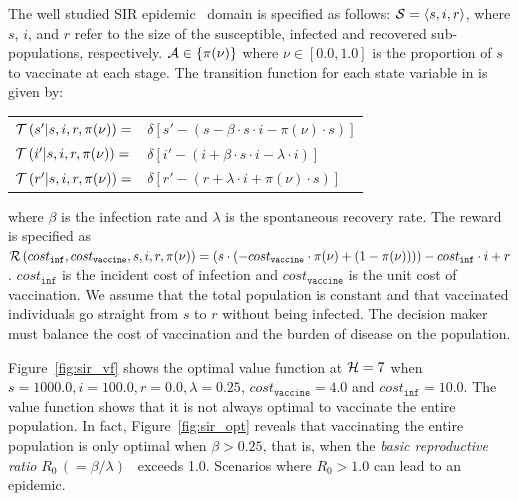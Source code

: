 \documentclass[letterpaper]{article}
\begin{document}
The well studied SIR epidemic~\cite{KermackMcKendrick_1927} domain is specified as follows: {\footnotesize $ \mathcal{S} = \left\langle s, i, r \right\rangle$}, where $ s $, $ i $, and $ r $ refer to the size of the susceptible, infected and recovered sub-populations, respectively. {\footnotesize $ \mathcal{A} \in \left\lbrace \pi(\nu) \right\rbrace $} where {\footnotesize $\nu \in \left[0.0, 1.0\right]$} is the proportion of $ s $ to vaccinate at each stage. The transition function {\footnotesize \Transition} for each state variable in {\footnotesize \State} is given by:

{\footnotesize 
    \begin{tabular}{ll}
        $ \mathcal{T}\left( s' | s, i, r, \pi(\nu) \right) =$ & $ \delta \left[ s' - (s - \beta \cdot s \cdot i - \pi(\nu) \cdot s) \right] $ \\
        $ \mathcal{T}\left( i' | s, i, r, \pi(\nu) \right) =$ & $ \delta \left[ i' - (i + \beta \cdot s \cdot i - \lambda \cdot i) \right] $ \\
        $ \mathcal{T}\left( r' | s, i, r, \pi(\nu) \right) =$ & $ \delta \left[ r' - (r + \lambda \cdot i + \pi(\nu) \cdot s) \right] $ \\            
    \end{tabular}
}%
where {\footnotesize $ \beta $} is the infection rate and {\footnotesize $\lambda$} is the spontaneous recovery rate. The reward is specified as {\footnotesize $ \mathcal{R}\left(cost_{\mathtt{inf}}, cost_{\mathtt{vaccine}}, s, i, r, \pi(\nu) \right) = (s \cdot (-cost_{\mathtt{vaccine}} \cdot \pi(\nu) + (1 - \pi(\nu)))) - cost_{\mathtt{inf}} \cdot i + r$}. {\footnotesize $ cost_{\mathtt{inf}} $} is the incident cost of infection and {\footnotesize $ cost_{\mathtt{vaccine}} $} is the unit cost of vaccination. We assume that the total population is constant and that vaccinated individuals go straight from {\footnotesize $ s $} to {\footnotesize $ r $} without being infected. The decision maker must balance the cost of vaccination and the burden of disease on the population. 

Figure~\ref{fig:sir_vf} shows the optimal value function at {\footnotesize$ \mathcal{H} = 7 $} when {\footnotesize $ s = 1000.0, i = 100.0, r = 0.0, \lambda = 0.25 $}, {\footnotesize $ cost_{\mathtt{vaccine}} = 4.0$} and {\footnotesize $ cost_{\mathtt{inf}} = 10.0 $}. The value function shows that it is not always optimal to vaccinate the entire population. In fact, Figure~\ref{fig:sir_opt} reveals that vaccinating the entire population is only optimal when {\footnotesize $ \beta > 0.25 $}, that is, when the \textit{basic reproductive ratio} {\footnotesize $ R_0 \,(= \beta/\lambda)$}~\cite{Heffernan_2005} exceeds 1.0. Scenarios where {\footnotesize $R_0 > 1.0$} can lead to an epidemic. 
\end{document}
